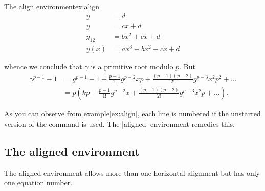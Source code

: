 \begin{texexample}{The align environment}{ex:align}
\begin{align}
         y & =d\label{eq:IntoSection}\\
         y & =cx+d\\
 y_{12} & =bx^{2}+cx+d\\
     y(x) & =ax^{3}+bx^{2}+cx+d
 \end{align}


whence we conclude that $\gamma$ is a primitive root modulo $p$. But
\begin{align*}
\gamma^{p-1}-1 &=
     g^{p-1} - 1 + \frac{p-1}{1!}g^{p-2}xp +
        \frac{(p-1)(p-2)}{2!}g^{p-3}x^2p^2 + \ldots \\
  &= p\left(kp + \frac{p-1}{1!}g^{p-2}x +
        \frac{(p-1)(p-2)}{2!}g^{p-3}x^2p + \ldots\right).
\end{align*}
\end{texexample}

As you can observe from example\ref{ex:align}, each line is numbered if the unstarred version of the command is used. The |aligned| environment remedies this.
 


\subsection{The aligned environment}

The aligned environment allows more than one horizontal alignment but has only one equation number.

